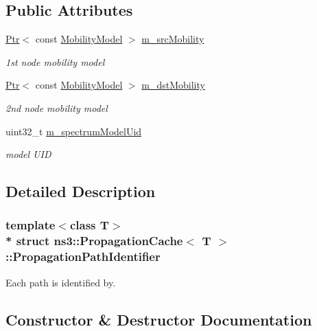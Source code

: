 \subsection*{Public Attributes}
\begin{DoxyCompactItemize}
\item 
\hyperlink{classns3_1_1Ptr}{Ptr}$<$ const \hyperlink{classns3_1_1MobilityModel}{Mobility\+Model} $>$ \hyperlink{structns3_1_1PropagationCache_1_1PropagationPathIdentifier_a89a398a7cce2c9a9b7bb4bc0ddc45710}{m\+\_\+src\+Mobility}
\begin{DoxyCompactList}\small\item\em 1st node mobility model \end{DoxyCompactList}\item 
\hyperlink{classns3_1_1Ptr}{Ptr}$<$ const \hyperlink{classns3_1_1MobilityModel}{Mobility\+Model} $>$ \hyperlink{structns3_1_1PropagationCache_1_1PropagationPathIdentifier_ab5da776321dcac22d720c88e49931096}{m\+\_\+dst\+Mobility}
\begin{DoxyCompactList}\small\item\em 2nd node mobility model \end{DoxyCompactList}\item 
uint32\+\_\+t \hyperlink{structns3_1_1PropagationCache_1_1PropagationPathIdentifier_a9396f0ffb7dda7ec56e2a576153e2d19}{m\+\_\+spectrum\+Model\+Uid}
\begin{DoxyCompactList}\small\item\em model U\+ID \end{DoxyCompactList}\end{DoxyCompactItemize}


\subsection{Detailed Description}
\subsubsection*{template$<$class T$>$\\*
struct ns3\+::\+Propagation\+Cache$<$ T $>$\+::\+Propagation\+Path\+Identifier}

Each path is identified by. 

\subsection{Constructor \& Destructor Documentation}
